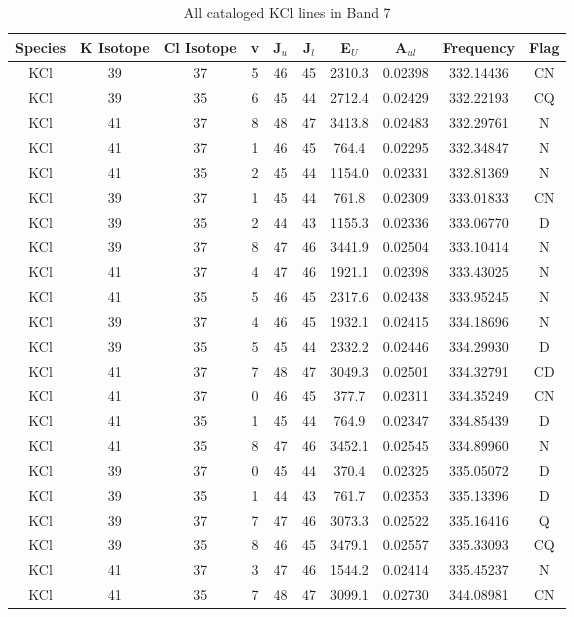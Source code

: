 \begin{table*}[htp]
\centering
\caption{All cataloged KCl lines in Band 7}
\begin{tabular}{cccccccccc}
\label{tab:K_detections_B7}
Species & K Isotope & Cl Isotope & v & J$_u$ & J$_l$ & E$_U$ & A$_{ul}$ & Frequency & Flag \\
\hline
KCl & 39 & 37 & 5 & 46 & 45 & 2310.3 & 0.02398 & 332.14436 & CN \\
KCl & 39 & 35 & 6 & 45 & 44 & 2712.4 & 0.02429 & 332.22193 & CQ \\
KCl & 41 & 37 & 8 & 48 & 47 & 3413.8 & 0.02483 & 332.29761 & N \\
KCl & 41 & 37 & 1 & 46 & 45 & 764.4 & 0.02295 & 332.34847 & N \\
KCl & 41 & 35 & 2 & 45 & 44 & 1154.0 & 0.02331 & 332.81369 & N \\
KCl & 39 & 37 & 1 & 45 & 44 & 761.8 & 0.02309 & 333.01833 & CN \\
KCl & 39 & 35 & 2 & 44 & 43 & 1155.3 & 0.02336 & 333.06770 & D \\
KCl & 39 & 37 & 8 & 47 & 46 & 3441.9 & 0.02504 & 333.10414 & N \\
KCl & 41 & 37 & 4 & 47 & 46 & 1921.1 & 0.02398 & 333.43025 & N \\
KCl & 41 & 35 & 5 & 46 & 45 & 2317.6 & 0.02438 & 333.95245 & N \\
KCl & 39 & 37 & 4 & 46 & 45 & 1932.1 & 0.02415 & 334.18696 & N \\
KCl & 39 & 35 & 5 & 45 & 44 & 2332.2 & 0.02446 & 334.29930 & D \\
KCl & 41 & 37 & 7 & 48 & 47 & 3049.3 & 0.02501 & 334.32791 & CD \\
KCl & 41 & 37 & 0 & 46 & 45 & 377.7 & 0.02311 & 334.35249 & CN \\
KCl & 41 & 35 & 1 & 45 & 44 & 764.9 & 0.02347 & 334.85439 & D \\
KCl & 41 & 35 & 8 & 47 & 46 & 3452.1 & 0.02545 & 334.89960 & N \\
KCl & 39 & 37 & 0 & 45 & 44 & 370.4 & 0.02325 & 335.05072 & D \\
KCl & 39 & 35 & 1 & 44 & 43 & 761.7 & 0.02353 & 335.13396 & D \\
KCl & 39 & 37 & 7 & 47 & 46 & 3073.3 & 0.02522 & 335.16416 & Q \\
KCl & 39 & 35 & 8 & 46 & 45 & 3479.1 & 0.02557 & 335.33093 & CQ \\
KCl & 41 & 37 & 3 & 47 & 46 & 1544.2 & 0.02414 & 335.45237 & N \\
KCl & 41 & 35 & 7 & 48 & 47 & 3099.1 & 0.02730 & 344.08981 & CN \\

\end{tabular}
\end{table*}
